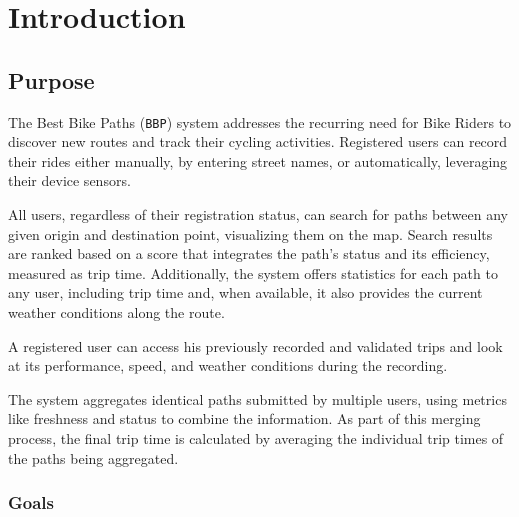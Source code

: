 \chapter{Introduction}
\label{ch:introduction}

\section{Purpose}
\label{sec:purpose}

The Best Bike Paths (\texttt{BBP}) system addresses the recurring need for Bike Riders to discover new routes and track their cycling activities. Registered users can record their rides either manually, by entering street names, or automatically, leveraging their device sensors.

All users, regardless of their registration status, can search for paths between any given origin and destination point, visualizing them on the map. Search results are ranked based on a score that integrates the path's status and its efficiency, measured as trip time. Additionally, the system offers statistics for each path to any user, including trip time and, when available, it also provides the current weather conditions along the route.

A registered user can access his previously recorded and validated trips and look at its performance, speed, and weather conditions during the recording.

The system aggregates identical paths submitted by multiple users, using metrics like freshness and status to combine the information. As part of this merging process, the final trip time is calculated by averaging the individual trip times of the paths being aggregated.

\subsection{Goals}
\label{subsec:goals}

